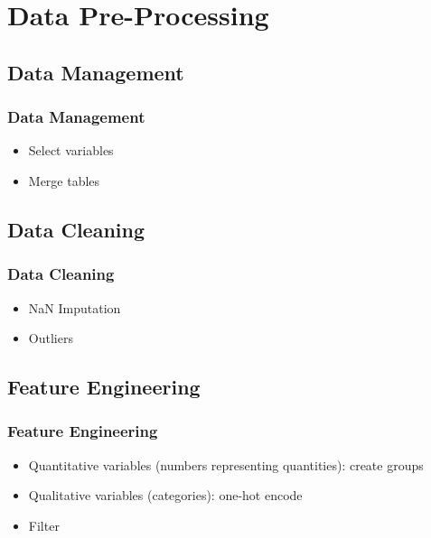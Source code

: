 \section{Data Pre-Processing}


\subsection{Data Management}

\begin{frame}\frametitle{Data Management}
   \begin{itemize}
      \item Select variables
      \item Merge tables
   \end{itemize}
\end{frame}


\subsection{Data Cleaning}

\begin{frame}\frametitle{Data Cleaning}
   \begin{itemize}
      \item NaN Imputation
      \item Outliers
   \end{itemize}
\end{frame}


\subsection{Feature Engineering}

\begin{frame}\frametitle{Feature Engineering}
   \begin{itemize}
      \item Quantitative variables (numbers representing quantities): create groups
      \item Qualitative variables (categories): one-hot encode
      \item Filter
   \end{itemize}
\end{frame}




